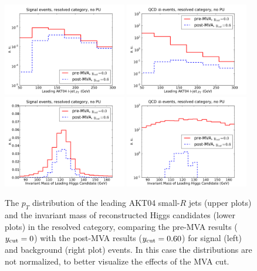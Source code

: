 \begin{figure}[t]
\begin{center}
\includegraphics[width=0.48\textwidth]{plots/pt_H0_sub0_res_noPU_ANNcut.pdf}
\includegraphics[width=0.48\textwidth]{plots/pt_H0_sub0_res_noPU_ANNcut_back_4b.pdf}
\includegraphics[width=0.48\textwidth]{plots/m_H0_res_noPU_ANNcut.pdf}
\includegraphics[width=0.48\textwidth]{plots/m_H0_res_noPU_ANNcut_back_4b.pdf}
\caption{\small
  The $p_T$ distribution of the leading AKT04 small-$R$ jets (upper plots)
  and
  the invariant mass of reconstructed Higgs candidates (lower plots) in the resolved
  category, comparing the pre-MVA results ($y_{\rm cut}=0$) with the post-MVA
  results ($y_{\rm cut}=0.60$) for signal (left) and background (right plot) events.
  In this case the distributions are not normalized, to better visualize the effects
  of the MVA cut.
}
\label{fig:pt_H0_sub0_res_noPU_ANNcut}
\end{center}
\end{figure}



